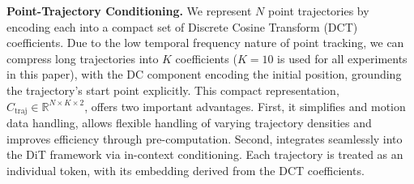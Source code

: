 

\noindent\textbf{Point-Trajectory Conditioning.}
We represent $N$ point trajectories by encoding each into a compact set of Discrete Cosine Transform (DCT)~\cite{ahmed1974discrete} coefficients. Due to the low temporal frequency nature of point tracking, we can compress long trajectories into $K$ coefficients ($K=10$ is used for all experiments in this paper), with the DC component encoding the initial position, grounding the trajectory's start point explicitly. This compact representation, $C_\text{traj}\in\mathbb{R}^{N\times K \times 2}$, offers two important advantages. First, it simplifies and motion data handling, allows flexible handling of varying trajectory densities and improves efficiency through pre-computation. Second, integrates seamlessly into the DiT framework via in-context conditioning. Each trajectory is treated as an individual token, with its embedding derived from the DCT coefficients.


